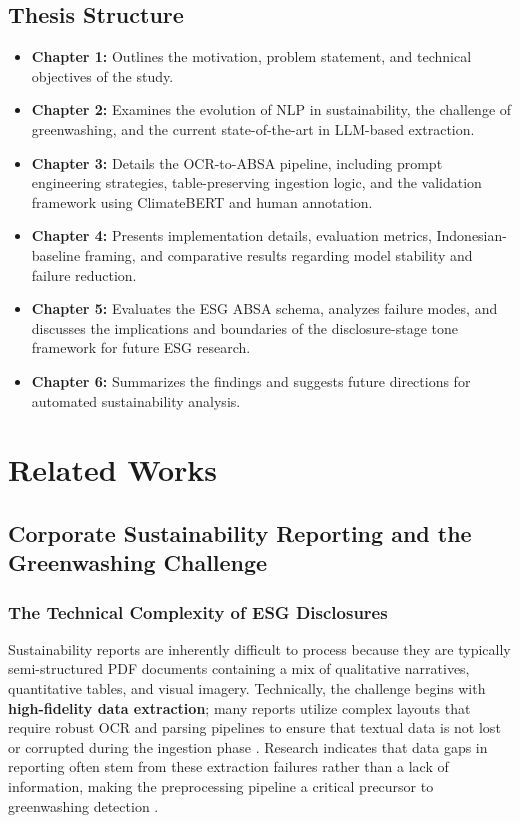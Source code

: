 \documentclass[english, online, cse, master]{dithesis}
\begin{document}
\section{Thesis Structure}
\begin{itemize}
\item 

\textbf{Chapter 1:} Outlines the motivation, problem statement, and technical objectives of the study.\item 

\textbf{Chapter 2:} Examines the evolution of NLP in sustainability, the challenge of greenwashing, and the current state-of-the-art in LLM-based extraction.\item 

\textbf{Chapter 3:} Details the OCR-to-ABSA pipeline, including prompt engineering strategies, table-preserving ingestion logic, and the validation framework using ClimateBERT and human annotation.\item 

\textbf{Chapter 4:} Presents implementation details, evaluation metrics, Indonesian-baseline framing, and comparative results regarding model stability and failure reduction.\item 

\textbf{Chapter 5:} Evaluates the ESG ABSA schema, analyzes failure modes, and discusses the implications and boundaries of the disclosure-stage tone framework for future ESG research.\item 

\textbf{Chapter 6:} Summarizes the findings and suggests future directions for automated sustainability analysis.
\end{itemize}
 

\chapter{Related Works}
  \label{relatedwork}
  \section{ Corporate Sustainability Reporting and the Greenwashing Challenge}
\subsection{ The Technical Complexity of ESG Disclosures}

Sustainability reports are inherently difficult to process because they are typically semi-structured PDF documents containing a mix of qualitative narratives, quantitative tables, and visual imagery. Technically, the challenge begins with \textbf{high-fidelity data extraction}; many reports utilize complex layouts that require robust OCR and parsing pipelines to ensure that textual data is not lost or corrupted during the ingestion phase  \parencite[]{marco_bronzini_bf94d949, jacob_beck_9548a833}. Research indicates that data gaps in reporting often stem from these extraction failures rather than a lack of information, making the preprocessing pipeline a critical precursor to greenwashing detection  \parencite{jacob_beck_9548a833}.
\end{document}
